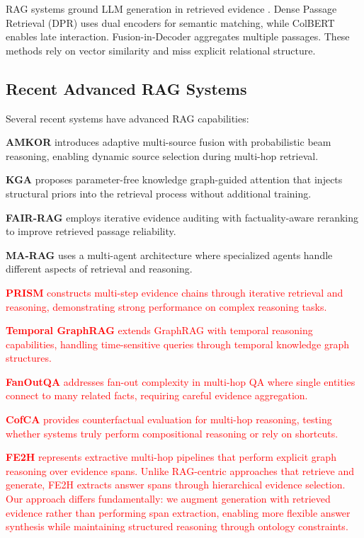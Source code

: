 \documentclass[10pt,twocolumn]{article}
\newcommand{\revisioncritical}[1]{\textcolor{red}{#1}}
\begin{document}
RAG systems ground LLM generation in retrieved evidence \cite{lewis2020rag}. Dense Passage Retrieval (DPR) \cite{karpukhin2020dpr} uses dual encoders for semantic matching, while ColBERT \cite{khattab2020colbert} enables late interaction. Fusion-in-Decoder \cite{izacard2021fid} aggregates multiple passages. These methods rely on vector similarity and miss explicit relational structure.

\subsection{Recent Advanced RAG Systems}
\label{sec:recent_rag}

Several recent systems have advanced RAG capabilities:

\textbf{AMKOR} \cite{fang2024amkor} introduces adaptive multi-source fusion with probabilistic beam reasoning, enabling dynamic source selection during multi-hop retrieval.

\textbf{KGA} \cite{wang2024kga} proposes parameter-free knowledge graph-guided attention that injects structural priors into the retrieval process without additional training.

\textbf{FAIR-RAG} \cite{chen2024fairrag} employs iterative evidence auditing with factuality-aware reranking to improve retrieved passage reliability.

\textbf{MA-RAG} \cite{li2024marag} uses a multi-agent architecture where specialized agents handle different aspects of retrieval and reasoning.

\revisioncritical{\textbf{PRISM} \cite{chen2024prism} constructs multi-step evidence chains through iterative retrieval and reasoning, demonstrating strong performance on complex reasoning tasks.

\textbf{Temporal GraphRAG} \cite{lee2024temporalgraphrag} extends GraphRAG with temporal reasoning capabilities, handling time-sensitive queries through temporal knowledge graph structures.

\textbf{FanOutQA} \cite{zhu2024fanoutqa} addresses fan-out complexity in multi-hop QA where single entities connect to many related facts, requiring careful evidence aggregation.

\textbf{CofCA} \cite{wu2024cofca} provides counterfactual evaluation for multi-hop reasoning, testing whether systems truly perform compositional reasoning or rely on shortcuts.

\textbf{FE2H} \cite{tu2022fe2h} represents extractive multi-hop pipelines that perform explicit graph reasoning over evidence spans. Unlike RAG-centric approaches that retrieve and generate, FE2H extracts answer spans through hierarchical evidence selection. Our approach differs fundamentally: we augment generation with retrieved evidence rather than performing span extraction, enabling more flexible answer synthesis while maintaining structured reasoning through ontology constraints.}
\end{document}
